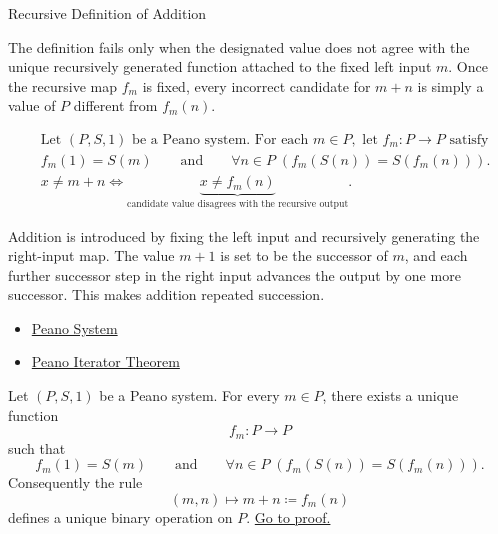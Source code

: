 \begin{topicbox}{Recursive Definition of Addition}
\begin{remark*}
The definition fails only when the designated value does not agree with the
unique recursively generated function attached to the fixed left input $m$.
Once the recursive map $f_m$ is fixed, every incorrect candidate for $m+n$ is
simply a value of $P$ different from $f_m(n)$.
\end{remark*}

\begin{remark*}
\[
\begin{aligned}
&\text{Let } (P,S,1) \text{ be a Peano system. For each } m \in P,
\text{ let } f_m : P \to P \text{ satisfy}\\
&f_m(1)=S(m)
\qquad\text{and}\qquad
\forall n \in P\;(f_m(S(n))=S(f_m(n))).\\
&x \neq m+n
\Longleftrightarrow
\underbrace{x \neq f_m(n)}_{\text{candidate value disagrees with the recursive output}}.
\end{aligned}
\]
\end{remark*}

\begin{remark*}[Interpretation]
Addition is introduced by fixing the left input and recursively generating the
right-input map. The value $m+1$ is set to be the successor of $m$, and each
further successor step in the right input advances the output by one more
successor. This makes addition repeated succession.
\end{remark*}

\begin{dependencies}
\begin{itemize}
  \item \hyperref[def:peano-system]{Peano System}
  \item \hyperref[thm:peano-iterator-theorem]{Peano Iterator Theorem}
\end{itemize}
\end{dependencies}

\begin{tcolorbox}[colback=thmbox, colframe=thmborder, arc=2pt,
  left=6pt, right=6pt, top=4pt, bottom=4pt,
  title={\small\textbf{Theorem (Addition Is Well-Defined on a Peano System)}},
  fonttitle=\small\bfseries]
\begin{theorem}
\label{thm:addition-well-defined-on-peano-system}
Let $(P,S,1)$ be a Peano system. For every $m \in P$, there exists a unique
function
\[
f_m : P \to P
\]
such that
\[
f_m(1)=S(m)
\qquad\text{and}\qquad
\forall n \in P\;(f_m(S(n))=S(f_m(n))).
\]
Consequently the rule
\[
(m,n) \longmapsto m+n \coloneqq f_m(n)
\]
defines a unique binary operation on $P$.
\hyperref[prf:addition-well-defined-on-peano-system]{Go to proof.}
\end{theorem}
\end{tcolorbox}


\end{topicbox}
